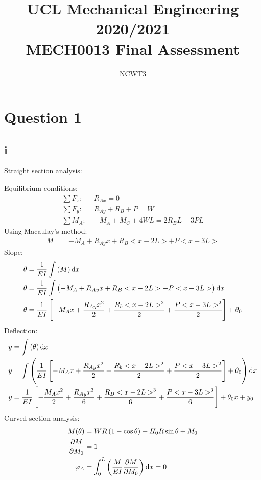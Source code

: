 \documentclass[11pt]{article}
\numberwithin{equation}{section}
\begin{document}
\title{\textbf{UCL Mechanical Engineering 2020/2021}\\MECH0013 Final Assessment}
\author{NCWT3}
\maketitle
\tableofcontents
\listoffigures
\section{Question 1}
\subsection{i}
Straight section analysis:

Equilibrium conditions:
\begin{align}
    \sum F_x: \; &R_{Ax} = 0\\
    \sum F_y: \; &R_{Ay} + R_B + P = W \label{q1isumy}\\
    \sum M_A: \; &-M_A + M_C + 4WL = 2R_B L + 3PL
\end{align}
Using Macaulay's method:
\begin{align}
    M &= -M_A + R_{Ay}x + R_B <x- 2L> + P<x-3L>
\end{align}
Slope:
\begin{align}
    \theta &= \frac{1}{EI} \int \left(M\right)\dif x\\
    \theta &= \frac{1}{EI} \int \left(-M_A + R_{Ay}x + R_B <x- 2L> + P<x-3L>\right) \dif x\\
    \theta &= \frac{1}{EI} \left[-M_A x + \frac{R_{Ay}x^2}{2} + \frac{R_b<x - 2L>^2}{2} + \frac{P<x-3L>^2}{2}\right] + \theta_0
\end{align}
Deflection:
\begin{align}
    y &= \int \left(\theta\right) \dif x\\
    y &= \int \left(\frac{1}{EI} \left[-M_A x + \frac{R_{Ay}x^2}{2} + \frac{R_b<x - 2L>^2}{2} + \frac{P<x-3L>^2}{2}\right] + \theta_0\right) \dif x\\
    y &= \frac{1}{EI} \left[-\frac{M_A x^2}{2} + \frac{R_{Ay}x^3}{6} + \frac{R_B<x- 2L>^3}{6} + \frac{P<x-3L>^3}{6}\right] + \theta_0 x +y_0
\end{align}
Curved section analysis:
\begin{align}
    M(\theta) &= WR\left(1 - \cos \theta\right) + H_0 R \sin\theta + M_0\\
    \frac{\partial M}{\partial M_0} &= 1\\
    \varphi_A &= \int_0^L \left(\frac{M}{EI}\frac{\partial M}{\partial M_0}\right)\dif x = 0
\end{align}
\end{document}
